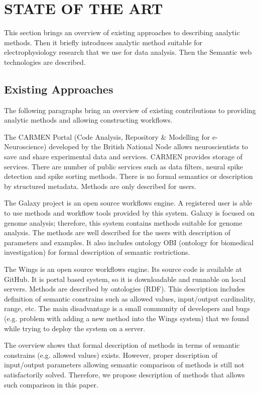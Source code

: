 \documentclass[a4paper,twoside]{article}
\begin{document}
\section{\uppercase{State of the Art}}

\noindent This section brings an overview of existing approaches to describing analytic methods. Then it briefly introduces analytic method suitable for electrophysiology research that we use for data analysis. Then the Semantic web technologies are described.

\subsection{Existing Approaches}

The following paragraphs bring an overview of existing contributions to providing  analytic methods and allowing constructing workflows.

The CARMEN Portal \cite{Watson07} (Code Analysis, Repository \& Modelling for e-Neuroscience) developed by the British National Node allows neuroscientists to save and share experimental data and services. CARMEN provides storage of services. There are number of public services such as data filters, neural spike detection and spike sorting methods. There is no formal semantics or description by structured metadata. Methods are only described for users.

The Galaxy project \cite{goecks2010galaxy, blankenberg2010galaxy, giardine2005galaxy} is an open source workflows engine. A registered user is able to use methods and workflow tools provided by this system. Galaxy is focused on genome analysis; therefore, this system contains methods suitable for genome analysis. The methods are well described for the users with description of parameters and examples. It also includes ontology OBI (ontology for biomedical investigation) for formal description of semantic restrictions.

The Wings is an open source workflows engine. Its source code is available at GitHub. It is portal based system, so it is downloadable and runnable on local servers. Methods are described by ontologies (RDF). This description includes definition of semantic constrains such as allowed values, input/output cardinality, range, etc. The main disadvantage is a small community of developers and bugs (e.g. problem with adding a new method into the Wings system) that we found while trying to deploy the system on a server.

The overview shows that formal description of methods in terms of semantic constrains (e.g. allowed values) exists. However, proper description of input/output parameters allowing semantic comparison of methods is still not satisfactorily solved. Therefore, we propose description of methods that allows such comparison in this paper.
\end{document}
